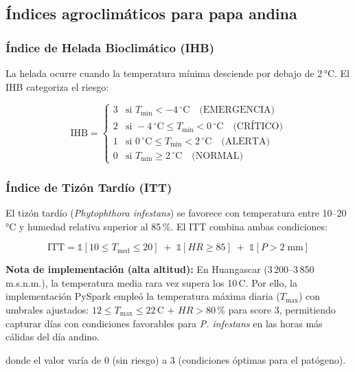 \documentclass[12pt,a4paper]{article}
\begin{document}
\subsection{Índices agroclimáticos para papa andina}

\subsubsection{Índice de Helada Bioclimático (IHB)}
La helada ocurre cuando la temperatura mínima desciende por debajo de
2\,°C. El IHB categoriza el riesgo:

\begin{equation}
  \text{IHB} =
  \begin{cases}
    3 & \text{si } T_{\min} < -4\,^{\circ}\text{C} \quad \text{(EMERGENCIA)} \\
    2 & \text{si } {-}4\,^{\circ}\text{C} \le T_{\min} < 0\,^{\circ}\text{C} \quad \text{(CRÍTICO)} \\
    1 & \text{si } 0\,^{\circ}\text{C} \le T_{\min} < 2\,^{\circ}\text{C} \quad \text{(ALERTA)} \\
    0 & \text{si } T_{\min} \ge 2\,^{\circ}\text{C} \quad \text{(NORMAL)}
  \end{cases}
\end{equation}

\subsubsection{Índice de Tizón Tardío (ITT)}
El tizón tardío (\textit{Phytophthora infestans}) se favorece con
temperatura entre 10--20\,°C y humedad relativa superior al 85\,\%.
El ITT combina ambas condiciones:

\begin{equation}
  \text{ITT} = \mathbb{1}[10 \le T_{\text{med}} \le 20]\;+\;
               \mathbb{1}[HR \ge 85]\;+\;
               \mathbb{1}[P > 2\;\text{mm}]
\end{equation}

\textbf{Nota de implementación (alta altitud):} En Huangascar (3\,200--3\,850 m.s.n.m.),
la temperatura media rara vez supera los 10\,\textdegree C. Por ello, la implementación PySpark
empleó la temperatura máxima diaria ($T_{\max}$) con umbrales ajustados:
$12 \le T_{\max} \le 22$\,\textdegree C + $HR > 80$\,\% para score 3,
permitiendo capturar días con condiciones favorables para \textit{P. infestans}
en las horas más cálidas del día andino.

donde el valor varía de 0 (sin riesgo) a 3 (condiciones óptimas para
el patógeno).
\end{document}
